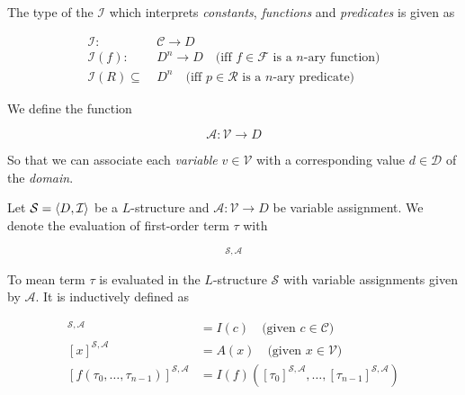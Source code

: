 \begin{definition}[Interpretation]
    The type of the  $\mathcal{I}$ which interprets
    \textit{constants}, \textit{functions} and \textit{predicates} is given as
    
    \begin{align}
        \mathcal{I} \colon 
            &\ \mathcal{C} \to D \\
        \mathcal{I}(f) \colon 
            &\ D^n \to D \quad\text{(iff $f \in \mathcal{F}$ is a $n$-ary function)} \\
        \mathcal{I}(R) \subseteq 
            &\ D^n \quad\text{(iff $p \in \mathcal{R}$ is a $n$-ary predicate)}    
    \end{align}
\end{definition}

\begin{definition}
    We define the  function
    
    \begin{equation}
        \mathcal{A} \colon \mathcal{V} \to D
    \end{equation}
    
    So that we can associate each \textit{variable} $v \in \mathcal{V}$ with a corresponding 
    value $d \in \mathcal{D}$ of the \textit{domain}.
\end{definition}

\begin{definition}
    Let $\mathcal{S} = \langle {D, \mathcal{I}} \rangle$ be a $L$-structure and 
    $\mathcal{A} \colon \mathcal{V} \to D$ be variable assignment. We denote the evaluation of 
    first-order term $\tau$ with
    
    \begin{equation}
        [\tau]^{\mathcal{S}, \mathcal{A}}
    \end{equation}
    
    To mean term $\tau$ is evaluated in the $L$-structure $\mathcal{S}$ with variable 
    assignments given by $\mathcal{A}$. It is inductively defined as
    
    \begin{align}
        [c]^{\mathcal{S}, \mathcal{A}} &= I(c) \quad\text{(given $c \in \mathcal{C}$)} \\
        [x]^{\mathcal{S}, \mathcal{A}} &= A(x) \quad\text{(given $x \in \mathcal{V}$)} \\
        [f(\tau_0, \ldots, \tau_{n-1})]^{\mathcal{S}, \mathcal{A}} &=
            I(f)([\tau_0]^{\mathcal{S}, \mathcal{A}}, \ldots, 
                [\tau_{n-1}]^{\mathcal{S}, \mathcal{A}})
    \end{align}
\end{definition}

